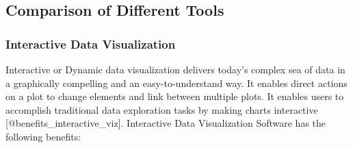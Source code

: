 \documentclass[]{book}
\theoremstyle{definition}
\theoremstyle{definition}
\theoremstyle{definition}
\theoremstyle{remark}
\begin{document}
\subsection{Comparison of Different
Tools}\label{comparison-of-different-tools}

\subsubsection{Interactive Data
Visualization}\label{interactive-data-visualization}

Interactive or Dynamic data visualization delivers today's complex sea
of data in a graphically compelling and an easy-to-understand way. It
enables direct actions on a plot to change elements and link between
multiple plots. It enables users to accomplish traditional data
exploration tasks by making charts interactive
{[}@benefits\_interactive\_viz{]}. Interactive Data Visualization
Software has the following benefits:
\end{document}
